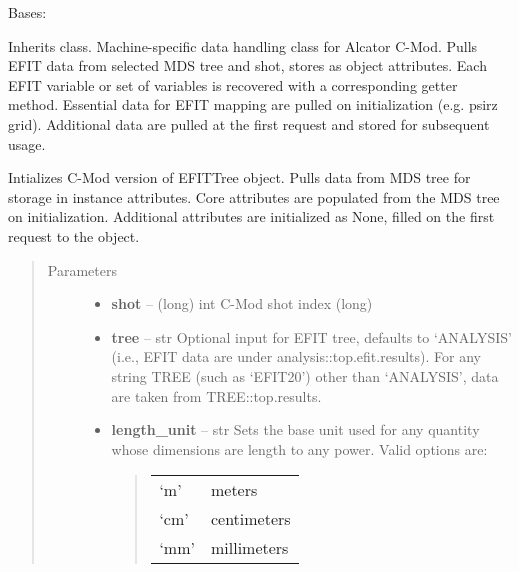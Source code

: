 \documentclass[letterpaper,10pt,english]{sphinxmanual}
\begin{document}
\begin{fulllineitems}
\label{eqtools:eqtools.CModEFIT.CModEFITTree}
Bases: {\hyperref[eqtools:eqtools.EFIT.EFITTree]{}}

Inherits  class. Machine-specific data
handling class for Alcator C-Mod. Pulls EFIT data from selected MDS tree
and shot, stores as object attributes. Each EFIT variable or set of
variables is recovered with a corresponding getter method. Essential data
for EFIT mapping are pulled on initialization (e.g. psirz grid). Additional
data are pulled at the first request and stored for subsequent usage.

Intializes C-Mod version of EFITTree object.  Pulls data from MDS tree for storage
in instance attributes.  Core attributes are populated from the MDS tree on initialization.
Additional attributes are initialized as None, filled on the first request to the object.
\begin{quote}\begin{description}
\item[{Parameters}] \leavevmode\begin{itemize}
\item {} 
\textbf{shot} -- (long) int
C-Mod shot index (long)

\item {} 
\textbf{tree} -- str
Optional input for EFIT tree, defaults to `ANALYSIS'
(i.e., EFIT data are under analysis::top.efit.results).
For any string TREE (such as `EFIT20') other than `ANALYSIS',
data are taken from TREE::top.results.

\item {} 
\textbf{length\_unit} -- 
str
Sets the base unit used for any quantity whose
dimensions are length to any power. Valid options are:
\begin{quote}

\begin{tabulary}{\linewidth}{|L|L|}
\hline

`m'
 & 
meters
\\

`cm'
 & 
centimeters
\\

`mm'
 & 
millimeters
\\


\end{tabulary}
\end{quote}
\end{itemize}
\end{description}
\end{quote}
\end{fulllineitems}
\end{document}
